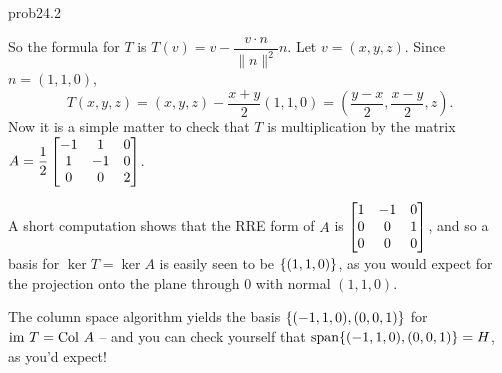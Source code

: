 \begin{sol}{prob24.2}
\begin{enumerate}[]
So the formula for $T$ is
$T(v)=v- \dfrac{v\cdot n}{\|n\|^2}n$. Let $v=(x,y,z)$. Since $n=(1,1,0)$,
$$T(x,y,z)=(x,y,z)- \dfrac{x+y}{2}(1,1,0)=(\frac{y-x}2,\frac{x-y}2, z ).$$Now it is a simple matter to check that $T$ is multiplication by the matrix $A=\dfrac12\bmatrix -1&1&0\\1&-1&0\\ 0&0&2\endbmatrix $.

A short computation shows that the RRE form of $A$ is $\bmatrix 
1 & -1 & 0 \\
 0 & 0 & 1 \\
 0 & 0 & 0 \endbmatrix$, and so a basis for $\ker T= \ker A$ is easily seen to be $\{(1,1,0) \}$, as you would expect for the projection onto the plane through $0$ with normal $(1,1,0)$.

The column space algorithm yields the basis $\{(-1,1,0), (0,0,1) \}$ for  $\operatorname{im}\, T = \operatorname{Col\,} A$ -- and you can check yourself that $\textrm{span}\{(-1,1,0), (0,0,1)\}=H$, as you'd expect!

 
\medskip
%
\end{enumerate}

\end{sol}

